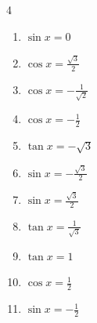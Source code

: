 \begin{multicols}{4}
\begin{enumerate}

  \item $\displaystyle \sin{x}  = 0$


  \item $\displaystyle \cos{x}  = \frac{\sqrt{3}}{2}$


\columnbreak %

  \item $\displaystyle \cos{x}  = -\frac{1}{\sqrt{2}}$


  \item $\displaystyle \cos{x}  = -\frac{1}{2}$


  \item $\displaystyle \tan{x}  = -\sqrt{3}$


  \item $\displaystyle \sin{x}  = -\frac{\sqrt{3}}{2}$


  \item $\displaystyle \sin{x}  = \frac{\sqrt{3}}{2}$


  \item $\displaystyle \tan{x}  = \frac{1}{\sqrt{3}}$


  \item $\displaystyle \tan{x}  = 1$


  \item $\displaystyle \cos{x}  = \frac{1}{2}$


  \item $\displaystyle \sin{x}  = -\frac{1}{2}$


\end{enumerate}
\end{multicols}
